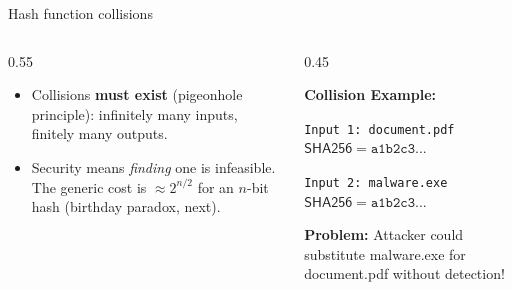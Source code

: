 \ifdefined\PRESENTATION\else\PassOptionsToClass{handout}{beamer}\fi\documentclass[aspectratio=169, lualatex]{beamer}
\begin{document}
\begin{frame}{Hash function collisions}
	\begin{columns}[c]
		\begin{column}{0.55\textwidth}
			\begin{itemize}
				\item Collisions \textbf{must exist} (pigeonhole principle): infinitely many inputs, finitely many outputs.
				\item Security means \emph{finding} one is infeasible. The generic cost is $\approx 2^{n/2}$ for an $n$-bit hash (birthday paradox, next).
			\end{itemize}
		\end{column}
		\begin{column}{0.45\textwidth}
			\begin{tcolorbox}[colback=black!5!white,colframe=ciphergray]
				\textbf{Collision Example:}

				\vspace{0.2cm}

				\texttt{Input 1: document.pdf}\\
				$\mathsf{SHA256} = \texttt{a1b2c3...}$

				\vspace{0.2cm}

				\texttt{Input 2: malware.exe}\\
				$\mathsf{SHA256} = \texttt{a1b2c3...}$

				\vspace{0.2cm}

				\textcolor{cipherprimary}{\textbf{Problem:} \small Attacker could substitute malware.exe for document.pdf without detection!}
			\end{tcolorbox}
		\end{column}
	\end{columns}
\end{frame}
\end{document}
